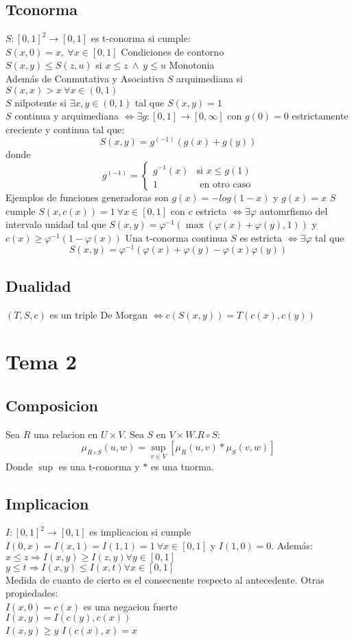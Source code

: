 \documentclass[paper=a4, fontsize=11pt]{scrartcl} %
\begin{document}
\subsection{Tconorma}
$S:[0,1]^2\rightarrow[0,1]$ es t-conorma si cumple:\\
$S(x,0)=x,\ \forall x\in[0,1]$ Condiciones de contorno\\ $S(x,y)\leq S(z,u)$ si $x\leq z\ \land\ y\leq u$ Monotonia\\ Además de Conmutativa y Asociativa
\medbreak $S$ arquimediana si $S(x,x)>x\ \forall x \in (0,1)$\\
$S$ nilpotente si $\exists x,y \in (0,1)$ tal que $S(x,y)=1$\\
$S$ continua y arquimediana $\iff \exists g:[0,1]\rightarrow[0,\infty]$ con $g(0)=0$ estrictamente creciente y continua tal que: $$S(x,y)=g^{(-1)}(g(x)+g(y))$$ donde 
$$g^{(-1)}=\begin{cases} g^{-1}(x) & \text{si }x\leq g(1) \\ 1 & \text{ en otro caso}
\end{cases}$$
Ejemplos de funciones generadoras son $g(x)=-log(1-x)$ y $g(x)=x$\medbreak
$S$ cumple $S(x,c(x))=1\ \forall x\in [0,1]$ con $c$ estricta $\iff \exists \varphi$ automrfismo del intervalo unidad tal que 
$S(x,y)=\varphi^{-1}(\max(\varphi(x)+\varphi(y),1))$ y $c(x)\geq \varphi^{-1}(1-\varphi(x))$\medbreak
Una t-conorma continua $S$ es estricta $\iff \exists \varphi$ tal que $$S(x,y)=\varphi^{-1}(\varphi(x)+\varphi(y)-\varphi(x)\varphi(y))$$
\bigbreak
\subsection{Dualidad}
$(T,S,c)$ es un triple De Morgan $\iff c(S(x,y))=T(c(x),c(y))$
\section{Tema 2}
\subsection{Composicion}
Sea $R$ una relacion en $U \times V$. Sea $S$ en $V \times W$.$R \circ S:$
$$\mu_{R \circ S}(u,w)= \sup_{v \in V}[\mu_R(u,v)\ast\mu_S(v,w)]$$
Donde $\sup$ es una t-conorma y $\ast$ es una tnorma.
\subsection{Implicacion}
$I:[0,1]^2\rightarrow[0,1]$ es implicacion si cumple $I(0,x)=I(x,1)=I(1,1)=1\ \forall x\in [0,1]$ y $I(1,0)=0$. Además:\\
$x \leq z \Rightarrow I(x,y) \geq I(z,y) \forall y \in [0,1]$\\
$y \leq t \Rightarrow I(x,y) \leq I(x,t) \forall x \in [0,1]$\\
Medida de cuanto de cierto es el consecuente respecto al antecedente. Otras propiedades:\\
$I(x,0) =c(x)$ es una negacion fuerte\\
$I(x,y) =I(c(y),c(x))$\\
$I(x,y) \geq y$
$I(c(x),x)=x$
\end{document}
